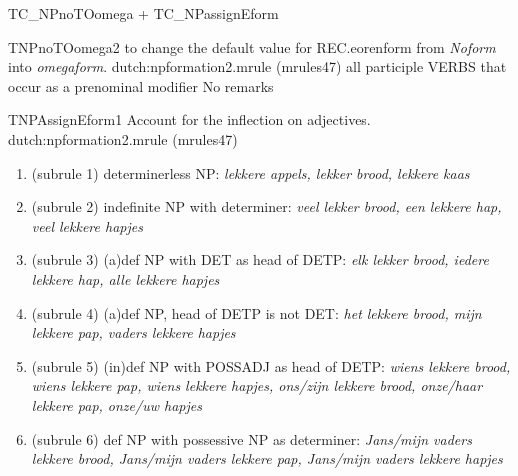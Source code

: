 \begin{mruleclass}{TC\_NPnoTOomega + TC\_NPassignEform}
\begin{members}
\begin{member}
\end{member}
\begin{member}
 TNPnoTOomega2
to change the default value for REC.eorenform from {\em Noform}
into {\em omegaform}.
\file dutch:npformation2.mrule (mrules47)
\semantics \nosemantics
\example all participle VERBS 
that occur as  a prenominal modifier
\remarks No remarks
\end{member}

\begin{member}
 TNPAssignEform1
 Account for the inflection on adjectives.
\file dutch:npformation2.mrule (mrules47)
\semantics \nosemantics
\example\mbox{}\\
\begin{enumerate} 
  \item
(subrule 1) determinerless NP: {\em lekkere appels, lekker brood, lekkere kaas}
  \item
(subrule 2) indefinite NP with determiner: {\em veel lekker brood, een 
lekkere hap, veel lekkere 
hapjes}
  \item
(subrule 3) (a)def NP with DET as head of DETP: {\em elk lekker brood, iedere 
lekkere hap, alle lekkere 
hapjes}
  \item
(subrule 4) (a)def NP, head of DETP is not DET: {\em 
het lekkere brood, mijn lekkere pap,
vaders lekkere hapjes}
  \item
(subrule 5) (in)def NP with POSSADJ as head of DETP: {\em wiens lekkere brood, 
wiens lekkere pap, wiens 
lekkere hapjes,
ons/zijn lekkere brood, onze/haar lekkere pap, onze/uw hapjes}
  \item
(subrule 6) def NP with possessive NP as determiner: {\em 
Jans/mijn vaders lekkere brood, Jans/mijn 
vaders lekkere pap,
Jans/mijn vaders lekkere hapjes}
\end{enumerate}


\end{member}
\end{members}
\end{mruleclass}
